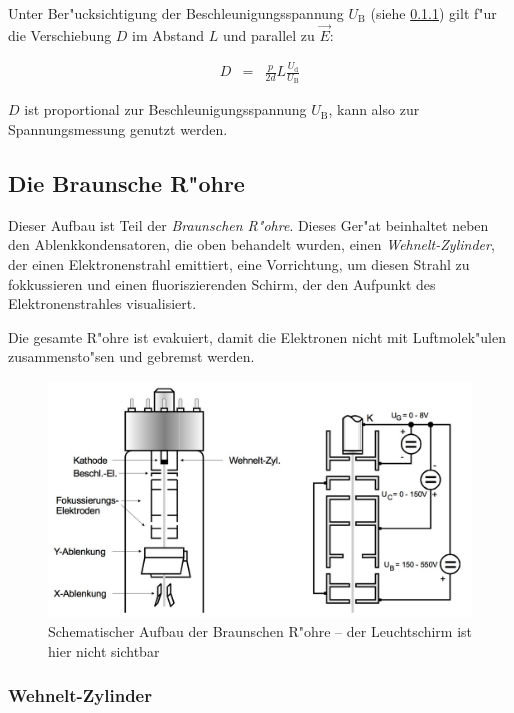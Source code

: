 		Unter Ber"ucksichtigung der Beschleunigungsspannung $U_\mathrm{B}$ (siehe \ref{wehnelt}) gilt f"ur die Verschiebung $D$ im Abstand $L$ und parallel zu $\vec{E}$:

		\begin{eqnarray}
			D & = & \frac{p}{2d} L \frac{U_\mathrm{d}}{U_\mathrm{B}}
			\label{verschiebung}
		\end{eqnarray}

		$D$ ist proportional zur Beschleunigungsspannung $U_\mathrm{B}$, kann also zur Spannungsmessung genutzt werden.

	\subsection{Die Braunsche R"ohre}

		Dieser Aufbau ist Teil der \emph{Braunschen R"ohre}. Dieses Ger"at beinhaltet neben den Ab\-lenk\-kon\-den\-sa\-to\-ren, die oben behandelt wurden,
		einen \emph{Wehnelt-Zylinder}, der einen Elektro\-nen\-strahl emittiert,
		eine Vorrichtung, um diesen Strahl zu fokkussieren
		und einen fluoris\-zieren\-den Schirm, der den Aufpunkt des Elektronenstrahles visualisiert.

		Die gesamte R"ohre ist evakuiert, damit die Elektronen nicht mit Luftmolek"ulen zu\-sam\-men\-sto\-"sen und gebremst werden.

		\begin{figure}[h]
			\centering
			\includegraphics[width = 14cm]{img/wehnelt-z.jpg}
			\caption{Schematischer Aufbau der Braunschen R"ohre -- der Leuchtschirm ist hier nicht sichtbar}
			\label{ablenkung}
		\end{figure}

		\subsubsection{Wehnelt-Zylinder}
		\label{wehnelt}

